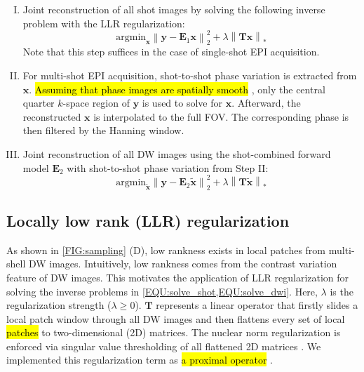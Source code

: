 \documentclass[preprint,12pt,authoryear,review]{elsarticle}
\begin{document}
    \begin{enumerate}[I.]
        \item Joint reconstruction of all shot images
        by solving the following inverse problem with
        the LLR regularization:
        \begin{equation}
            \mathrm{argmin}_\mathbf{x} \left\| \mathbf{y} - \mathbf{E}_1 \mathbf{x} \right\|_2^2
            + \lambda \left\| \mathbf{T} \mathbf{x} \right\|_*
            \label{EQU:solve_shot}
        \end{equation}
            Note that this step suffices in the case of single-shot EPI acquisition.

        \item For multi-shot EPI acquisition,
        shot-to-shot phase variation is extracted from $\mathbf{x}$.
        \hl{Assuming that phase images are spatially smooth}
        \citep{chen_2013_muse,dai_2023_julep},
        only the central quarter $k$-space region of $\mathbf{y}$
        is used to solve for $\mathbf{x}$.
        Afterward, the reconstructed $\mathbf{x}$ is interpolated to the full FOV.
        The corresponding phase is then filtered by the Hanning window.

        \item Joint reconstruction of all DW images using
        the shot-combined forward model $\mathbf{E}_2$
        with shot-to-shot phase variation from Step II:
        \begin{equation}
            \mathrm{argmin}_\mathbf{\tilde{x}} \left\| \mathbf{y} - \mathbf{E}_2 \mathbf{\tilde{x}} \right\|_2^2
            + \lambda \left\| \mathbf{T} \mathbf{\tilde{x}} \right\|_*
            \label{EQU:solve_dwi}
        \end{equation}
    \end{enumerate}

    \subsection{Locally low rank (LLR) regularization}

    As shown in \cref{FIG:sampling} (D), low rankness exists
    in local patches from multi-shell DW images.
    Intuitively, low rankness comes from the contrast variation feature of DW images.
    This motivates the application of LLR regularization \citep{trzasko_2011_lr,zhang_2015_llr}
    for solving the inverse problems in \cref{EQU:solve_shot,EQU:solve_dwi}.
    Here, $\lambda$ is the regularization strength ($\lambda \geq 0$).
    $\mathbf{T}$ represents a linear operator that firstly slides a local patch window
    through all DW images and then
    flattens every set of local \hl{patches} 
    to two-dimensional (2D) matrices.
    The nuclear norm regularization is enforced via
        singular value thresholding of all flattened 2D matrices \citep{cai_2010_svt}.
    We implemented this regularization term as \hl{a proximal operator}
    \citep{beck_2017_optim}. 
\end{document}
